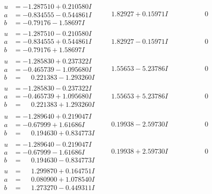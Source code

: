 \documentclass[1p]{elsarticle_modified}
\theoremstyle{definition}
\begin{document}
$$\begin{array}{c|c|c}
\begin{aligned}
u &= -1.287510 + 0.210580 I \\
a &= -0.834555 - 0.544861 I \\
b &= -0.79176 - 1.58697 I\end{aligned}
 & \phantom{-}1.82927 + 0.15971 I & \phantom{-0.000000 } 0 \\ \hline\begin{aligned}
u &= -1.287510 - 0.210580 I \\
a &= -0.834555 + 0.544861 I \\
b &= -0.79176 + 1.58697 I\end{aligned}
 & \phantom{-}1.82927 - 0.15971 I & \phantom{-0.000000 } 0 \\ \hline\begin{aligned}
u &= -1.285830 + 0.237322 I \\
a &= -0.465739 - 1.095680 I \\
b &= \phantom{-}0.221383 - 1.293260 I\end{aligned}
 & \phantom{-}1.55653 - 5.23786 I & \phantom{-0.000000 } 0 \\ \hline\begin{aligned}
u &= -1.285830 - 0.237322 I \\
a &= -0.465739 + 1.095680 I \\
b &= \phantom{-}0.221383 + 1.293260 I\end{aligned}
 & \phantom{-}1.55653 + 5.23786 I & \phantom{-0.000000 } 0 \\ \hline\begin{aligned}
u &= -1.289640 + 0.219047 I \\
a &= -0.67999 + 1.61686 I \\
b &= \phantom{-}0.194630 + 0.834773 I\end{aligned}
 & \phantom{-}0.19938 - 2.59730 I & \phantom{-0.000000 } 0 \\ \hline\begin{aligned}
u &= -1.289640 - 0.219047 I \\
a &= -0.67999 - 1.61686 I \\
b &= \phantom{-}0.194630 - 0.834773 I\end{aligned}
 & \phantom{-}0.19938 + 2.59730 I & \phantom{-0.000000 } 0 \\ \hline\begin{aligned}
u &= \phantom{-}1.299870 + 0.164751 I \\
a &= \phantom{-}0.080900 + 1.078540 I \\
b &= \phantom{-}1.273270 - 0.449311 I\end{aligned}

\end{array}$$
\end{document}
